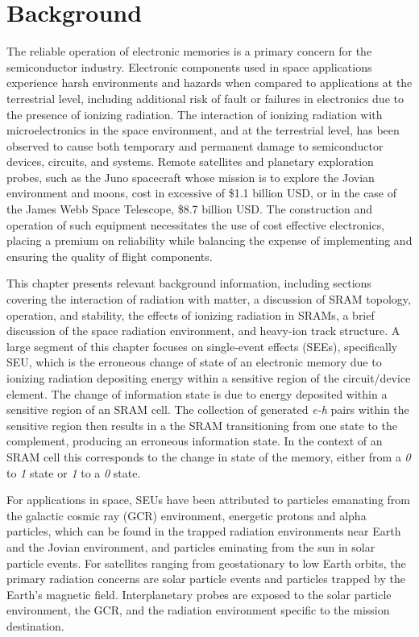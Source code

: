 \chapter{Background} %
\label{chap:background}
The reliable operation of electronic memories is a primary concern for the semiconductor industry. 
Electronic components used in space applications experience harsh environments and hazards when compared to applications at the terrestrial level, including additional risk of fault or failures in electronics due to the presence of ionizing radiation.
The interaction of ionizing radiation with microelectronics in the space environment, and at the terrestrial level, has been observed to cause both temporary and permanent damage to semiconductor devices, circuits, and systems.
Remote satellites and planetary exploration probes, such as the Juno spacecraft whose mission is to explore the Jovian environment and moons, cost in excessive of \$1.1 billion USD, or in the case of the James Webb Space Telescope, \$8.7 billion USD.
The construction and operation of such equipment necessitates the use of cost effective electronics, placing a premium on reliability while balancing the expense of implementing and ensuring the quality of flight components.

This chapter presents relevant background information, including sections covering the interaction of radiation with matter, a discussion of SRAM topology, operation, and stability, the effects of ionizing radiation in SRAMs, a brief discussion of the space radiation environment, and heavy-ion track structure.
A large segment of this chapter focuses on single-event effects (SEEs), specifically SEU, which is the erroneous change of state of an electronic memory due to ionizing radiation depositing energy within a sensitive region of the circuit/device element. 
The change of information state is due to energy deposited within a sensitive region of an SRAM cell.
The collection of generated \emph{e-h} pairs within the sensitive region then results in a the SRAM transitioning from one state to the complement, producing an erroneous information state.
In the context of an SRAM cell this corresponds to the change in state of the memory, either from a \emph{0} to \emph{1} state or \emph{1} to a \emph{0} state.

For applications in space, SEUs have been attributed to particles emanating from the galactic cosmic ray (GCR) environment, energetic protons and alpha particles, which can be found in the trapped radiation environments near Earth and the Jovian environment, and particles eminating from the sun in solar particle events.
For satellites ranging from geostationary to low Earth orbits, the primary radiation concerns are solar particle events and particles trapped by the Earth's magnetic field.
Interplanetary probes are exposed to the solar particle environment, the GCR, and the radiation environment specific to the mission destination.

